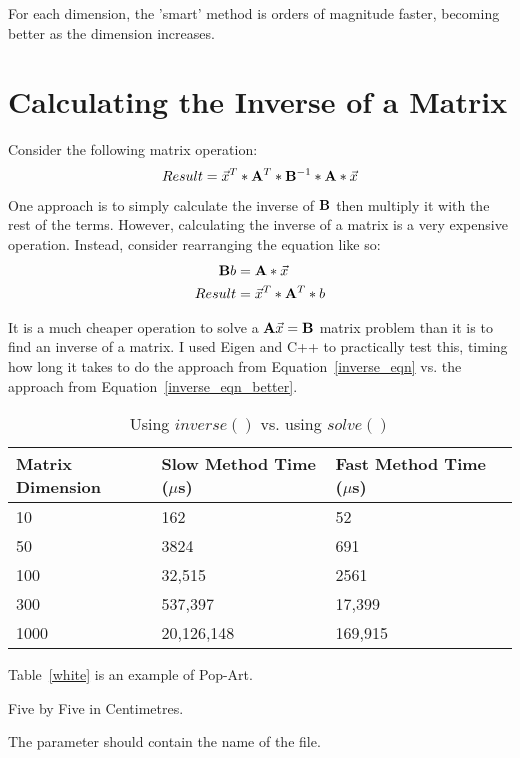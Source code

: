 \documentclass[report,12pt,notitlepage,onecolumn]{article}
\begin{document}
For each dimension, the 'smart' method is orders of magnitude faster, becoming better as the dimension increases.

\section{Calculating the Inverse of a Matrix}

Consider the following matrix operation:
\begin{equation}\label{inverse_eqn}
Result = \vec{x}^{T} * \mathbf{A}^{T} * \mathbf{B}^{-1} * \mathbf{A} * \vec{x}
\end{equation}

One approach is to simply calculate the inverse of $\mathbf{B}$ then multiply it with the rest of the terms. However, calculating the inverse of a matrix is a very expensive operation. Instead, consider rearranging the equation like so:
\begin{equation}
\begin{split}\label{inverse_eqn_better}
\mathbf{B}b &=  \mathbf{A} * \vec{x} \\
Result &= \vec{x}^{T} * \mathbf{A}^{T} * b
\end{split}
\end{equation}

It is a much cheaper operation to solve a $\mathbf{A}\vec{x} = \mathbf{B}$ matrix problem than it is to find an inverse of a matrix. I used Eigen and C++ to practically test this, timing how long it takes to do the approach from Equation~\ref{inverse_eqn} vs. the approach from Equation~\ref{inverse_eqn_better}.

\begin{table}[!h]
	\begin{tabular}{| l | l | l | l |}
		\hline
		Matrix Dimension & Slow Method Time ($\mu$s) & Fast Method Time ($\mu$s) \\ \hline
		10 & 162 & 52 \\ \hline
		50 & 3824 & 691  \\ \hline
		100 & 32,515 & 2561  \\ \hline
		300 & 537,397 & 17,399  \\ \hline
		1000 & 20,126,148 & 169,915 \\
		\hline
	\end{tabular}
	\caption{Using $inverse()$ vs. using $solve()$\label{data_inverse}}
\end{table}



Table~\ref{white} is an example of Pop-Art.
\begin{table}[!hbtp]
\makebox[\textwidth]{\framebox[5cm]{\rule{0pt}{5cm}}}
\caption[summary]{Five by Five in Centimetres.\label{white}}
\end{table}

The parameter
 should
contain the name of the file.
\end{document}
